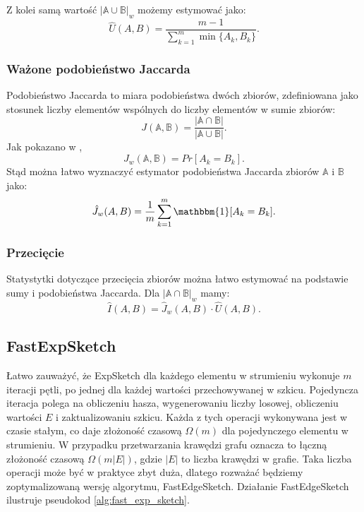     Z kolei samą wartość $|\mathbb{A} \cup \mathbb{B}|_{w}$ możemy estymować jako:
    \[
        \hat{U}(A, B) = \frac{m - 1}{\sum\limits_{k = 1}^{m} \min{\{A_k, B_k\}}} .
    \]

    \subsubsection*{Ważone podobieństwo Jaccarda} 
    Podobieństwo Jaccarda to miara podobieństwa dwóch zbiorów, zdefiniowana jako stosunek liczby elementów wspólnych do liczby elementów w sumie zbiorów:
    \[
        J(\mathbb{A}, \mathbb{B}) = \frac{|\mathbb{A} \cap \mathbb{B}|}{|\mathbb{A} \cup \mathbb{B}|}.
    \]
    Jak pokazano w \cite{Lemiesz_2021}, 
    \[
        J_w(\mathbb{A}, \mathbb{B}) = Pr[A_k = B_k]. 
    \]
    Stąd można łatwo wyznaczyć estymator podobieństwa Jaccarda zbiorów $\mathbb{A}$ i $\mathbb{B}$ jako:
    \[
        \hat{J}_w(A, B) = \frac{1}{m} \sum\limits_{k = 1}^{m} \mathbbm{1}[A_k = B_k].  
    \]

    \subsubsection*{Przecięcie}
    Statystytki dotyczące przecięcia zbiorów można łatwo estymować na podstawie sumy i podobieństwa Jaccarda. Dla $|\mathbb{A} \cap \mathbb{B}|_{w}$ mamy:
    \[
        \hat{I}(A, B) = \hat{J}_w(A, B) \cdot \hat{U}(A, B).  
    \]

\subsection{FastExpSketch}
    Łatwo zauważyć, że ExpSketch dla każdego elementu w strumieniu wykonuje $m$ iteracji pętli, po jednej dla każdej wartości przechowywanej w szkicu. Pojedyncza iteracja polega na obliczeniu hasza, wygenerowaniu liczby losowej, obliczeniu wartości $E$ i zaktualizowaniu szkicu. Każda z tych operacji wykonywana jest w czasie stałym, co daje złożoność czasową $\Omega(m)$ dla pojedynczego elementu w strumieniu. W przypadku przetwarzania krawędzi grafu oznacza to łączną złożoność czasową $\Omega(m|E|)$, gdzie $|E|$ to liczba krawędzi w grafie. Taka liczba operacji może być w praktyce zbyt duża, dlatego rozważać będziemy zoptymalizowaną wersję algorytmu, FastEdgeSketch\cite{Lemiesz_2023}. Działanie FastEdgeSketch ilustruje pseudokod \ref{alg:fast_exp_sketch}.

